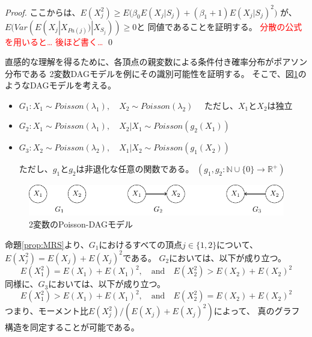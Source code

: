 \begin{proof}
  ここからは、$E(X_j^2) \geq E\bigl( \beta_0 E(X_j | S_j) +
  (\beta_1 + 1) E(X_j | S_j)^2 \bigl)$ が、
  $E(\mathit{Var}( E(X_j | X_{Pa(j)}) | X_{S_j} )) \geq 0$と
  同値であることを証明する。
  \textcolor{red}{分散の公式を用いると… 後ほど書く…}
  \qed

\end{proof}

直感的な理解を得るために、各頂点の親変数による条件付き確率分布がポアソン分布である
2変数DAGモデルを例にその識別可能性を証明する。
そこで、図\ref{fig:ex_bivariate}のようなDAGモデルを考える。

\begin{itemize}
  \item $G_1 \colon X_1 \sim \mathit{Poisson}(\lambda_1),
         \quad X_2 \sim \mathit{Poisson}(\lambda_2) \quad$ ただし、$X_1$と$X_2$は独立

  \item $G_2 \colon X_1 \sim \mathit{Poisson}(\lambda_1),
         \quad X_2|X_1 \sim \mathit{Poisson}(g_2(X_1))$

  \item $G_3 \colon X_2 \sim \mathit{Poisson}(\lambda_2),
         \quad X_1|X_2 \sim \mathit{Poisson}(g_1(X_2))$

  ただし、$g_1$と$g_2$は非退化な任意の関数である。
  $(g_1, g_2 \colon \mathbb{N} \cup \{ 0 \} \rightarrow \mathbb{R}^+)$
\end{itemize}

\begin{figure}[h]
  \centering
  \includegraphics{./picture/bivariate.pdf}
  \caption{2変数のPoisson-DAGモデル}
  \label{fig:ex_bivariate}
\end{figure}

命題\ref{prop:MRS}より、$G_1$におけるすべての頂点$j \in \{ 1,2 \}$について、
$E(X_j^2) = E(X_j) + E(X_j)^2$である。
$G_2$においては、以下が成り立つ。
\begin{equation*}
  E(X_1^2) = E(X_1) + E(X_1)^2, \quad \text{and} \quad
  E(X_2^2) > E(X_2) + E(X_2)^2
\end{equation*}
同様に、$G_3$においては、以下が成り立つ。
\begin{equation*}
  E(X_1^2) > E(X_1) + E(X_1)^2, \quad \text{and} \quad
  E(X_2^2) = E(X_2) + E(X_2)^2
\end{equation*}
つまり、モーメント比$E(X_j^2) / (E(X_j) + E(X_j)^2)$によって、
真のグラフ構造を同定することが可能である。

